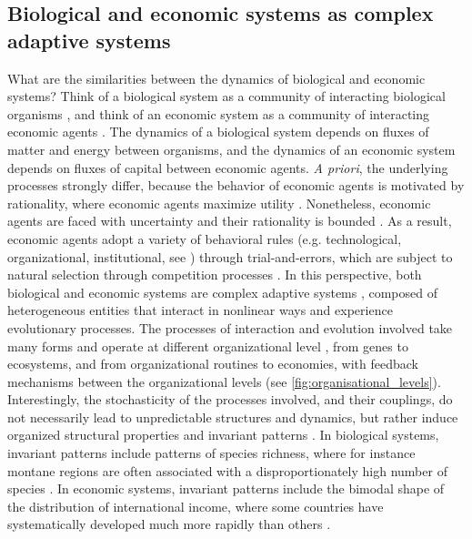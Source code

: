 \subsection{Biological and economic systems as complex adaptive systems}
What are the similarities between the dynamics of biological and economic systems? 
% 
Think of a biological system as a community of interacting biological organisms \citep{chapin2002principles}, and think of an economic system as a community of interacting economic agents \citep{Dopfer2007}.
% 
The dynamics of a biological system depends on fluxes of matter and energy between organisms, and the dynamics of an economic system depends on fluxes of capital between economic agents.
% 
\textit{A priori}, the underlying processes strongly differ, because the behavior of economic agents is motivated by rationality, where economic agents maximize utility \citep{10.1093/cje/bet027}. 
% 
Nonetheless, economic agents are faced with uncertainty \citep{Foster2012} and their rationality is bounded \citep{Veblen1898,nelson1985evolutionary}. As a result, economic agents adopt a variety of behavioral rules (e.g. technological, organizational, institutional, see \cite{Foster2012}) through trial-and-errors, which are subject to natural selection through competition processes \citep{schumpeter2017theory}.
% 
In this perspective, both biological and economic systems are complex adaptive systems \citep{Levin2002}, composed of heterogeneous entities that interact in nonlinear ways and experience evolutionary processes. 
% 
% 
The processes of interaction and evolution involved take many forms and operate at different organizational level \citep{Levin1998}, from genes to ecosystems, and from organizational routines to economies, with feedback mechanisms between the organizational levels (see \cref{fig:organisational_levels}).
% 
Interestingly, the stochasticity of the processes involved, and their couplings, do not necessarily lead to unpredictable structures and dynamics, but rather induce organized structural properties and invariant patterns \citep{Olff2009,mitchell2009complexity}. 
% 
In biological systems, invariant patterns include patterns of species richness, where for instance montane regions are often associated with a disproportionately high number of species \citep{Rahbek2019}. In economic systems, invariant patterns include the bimodal shape of the distribution of international income, where some countries have systematically developed much more rapidly than others \citep{acemoglu2001colonial}. 
